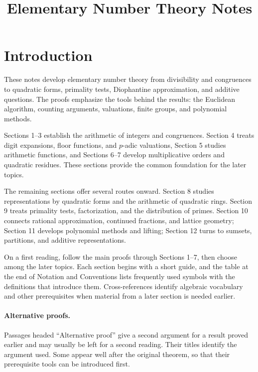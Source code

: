\documentclass[11pt]{article}
\title{Elementary Number Theory Notes}
\author{}
\date{}
\theoremstyle{ntstyle}
\begin{document}
\maketitle
\clearpage
\begingroup
\setlength{\parskip}{0pt}
\tableofcontents
\endgroup
\clearpage

\section*{Introduction}

These notes develop elementary number theory from divisibility and congruences
to quadratic forms, primality tests, Diophantine approximation, and additive
questions. The proofs emphasize the tools behind the results: the Euclidean
algorithm, counting arguments, valuations, finite groups, and polynomial methods.

Sections 1--3 establish the arithmetic of integers and congruences. Section 4
treats digit expansions, floor functions, and $p$-adic valuations, Section 5 studies arithmetic functions,
and Sections 6--7 develop multiplicative orders and quadratic residues.
These sections provide the common foundation for the later topics.

The remaining sections offer several routes onward. Section 8 studies
representations by quadratic forms and the arithmetic of quadratic rings.
Section 9 treats primality tests, factorization, and the distribution of primes.
Section 10 connects rational approximation, continued fractions, and lattice
geometry; Section 11 develops polynomial methods and lifting; Section 12
turns to sumsets, partitions, and additive representations.

On a first reading, follow the main proofs through Sections 1--7, then choose
among the later topics. Each section begins with a short guide, and the table at the end of
Notation and Conventions lists frequently used symbols with the definitions that introduce them.
Cross-references identify algebraic vocabulary and other prerequisites when material
from a later section is needed earlier.

\paragraph*{Alternative proofs.} Passages headed ``Alternative proof'' give a second argument
for a result proved earlier and may usually be left for a second reading. Their titles
identify the argument used. Some appear well after the original theorem, so that their
prerequisite tools can be introduced first.
\end{document}
